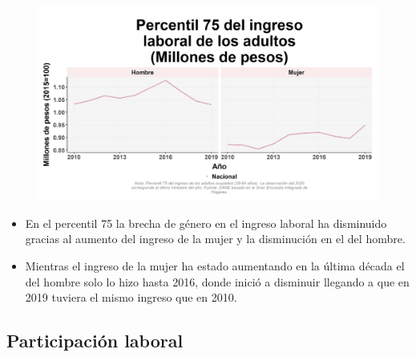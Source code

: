     \begin{figure}[H]
        \caption[Percentil 75 del ingreso laboral de los adultos por género ]{\label{inglab75adu_gen_trend} }
        \begin{center}
        \includegraphics[width=\textwidth,keepaspectratio]{img/var_29_trend.png}
        \end{center}
    \end{figure}
            \begin{itemize}
                \item En el percentil 75 la brecha de género en el ingreso laboral ha disminuido gracias al aumento del ingreso de la mujer y la disminución en el del hombre.
                \item Mientras el ingreso de la mujer ha estado aumentando en la última década el del hombre solo lo hizo hasta 2016, donde inició a disminuir llegando a que en 2019 tuviera el mismo ingreso que en 2010.
                \end{itemize}

    \subsection{Participación laboral}

